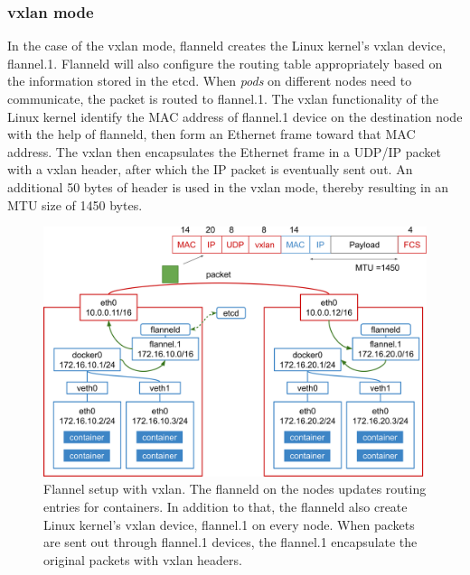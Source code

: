 \FloatBarrier

\subsubsection{vxlan mode}

In the case of the vxlan mode, flanneld creates the Linux kernel's vxlan device, flannel.1. 
Flanneld will also configure the routing table appropriately based on the information stored in the etcd.
When {\em pods} on different nodes need to communicate, the packet is routed to flannel.1.
The vxlan functionality of the Linux kernel identify the MAC address of flannel.1 device on the destination node with the help of flanneld, then form an Ethernet frame toward that MAC address.
The vxlan then encapsulates the Ethernet frame in a UDP/IP packet with a vxlan header, after which the IP packet is eventually sent out.
An additional 50 bytes of header is used in the vxlan mode, thereby resulting in an MTU size of 1450 bytes.

\begin{figure}[h]
  \centering
  \includegraphics[width=0.95\columnwidth]{Figs/flannel-vxlan}

  \par\bigskip
  \centering
  \begin{minipage}{0.9\columnwidth}
    \caption[Flannel setup with vxlan]{
      Flannel setup with vxlan.
      The flanneld on the nodes updates routing entries for containers.
      In addition to that, the flanneld also create Linux kernel's vxlan device, flannel.1 on every node.
      When packets are sent out through flannel.1 devices, the flannel.1 encapsulate the original packets with vxlan headers.
    }
    \label{Figs/flannel-vxlan}
  \end{minipage}
\end{figure}

